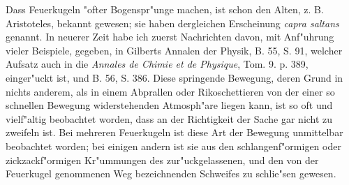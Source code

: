\documentclass[a4paper, 11pt, oneside, polutonikogreek, german]{article}
\begin{document}
Dass Feuerkugeln "ofter Bogenspr"unge machen, ist schon den Alten, z. B. Aristoteles, bekannt gewesen; sie haben dergleichen Erscheinung \emph{capra saltans} genannt. In neuerer Zeit habe ich zuerst Nachrichten davon, mit Anf"uhrung vieler Beispiele, gegeben, in Gilberts Annalen der Physik, B. 55, S. 91, welcher Aufsatz auch in die \emph{Annales de Chimie et de Physique}, Tom. 9. p. 389, einger"uckt ist, und B. 56, S. 386. Diese springende Bewegung, deren Grund in nichts anderem, als in einem Abprallen oder Rikoschettieren von der einer so schnellen Bewegung widerstehenden Atmosph"are liegen kann, ist so oft und vielf"altig beobachtet worden, dass an der Richtigkeit der Sache gar nicht zu zweifeln ist. Bei mehreren Feuerkugeln ist diese Art der Bewegung unmittelbar beobachtet worden; bei einigen andern ist sie aus den schlangenf"ormigen oder zickzackf"ormigen Kr"ummungen des zur"uckgelassenen, und den von der Feuerkugel genommenen Weg bezeichnenden Schweifes zu schlie"sen gewesen.
\end{document}
